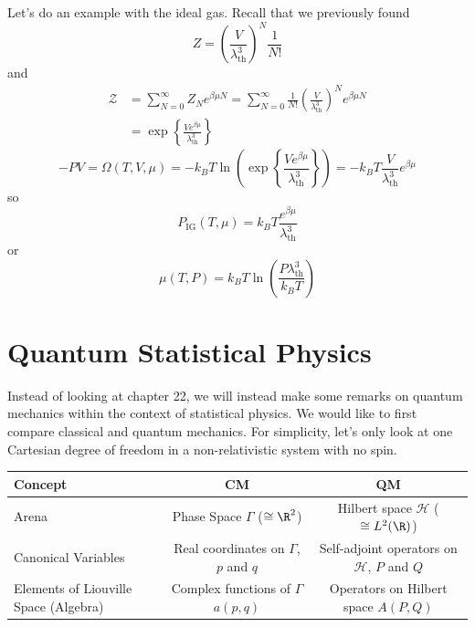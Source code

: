 \documentclass[a4paper,twoside,master.tex]{subfiles}
\begin{document}
\begin{ex}
    Let's do an example with the ideal gas. Recall that we previously found
    \begin{equation}
        Z = \left( \frac{V}{\lambda^3_{\text{th}}} \right)^N \frac{1}{N!}
    \end{equation}
    and
    \begin{align}
        \mathcal{Z} &= \sum_{N=0}^{\infty} Z_N e^{\beta \mu N} = \sum_{N=0}^{\infty} \frac{1}{N!} \left( \frac{V}{\lambda^3_{\text{th}}} \right)^N e^{\beta \mu N} \\
        &= \exp\left\{ \frac{V e^{\beta \mu}}{\lambda^3_{\text{th}}} \right\}
    \end{align}
    \begin{equation}
        - PV = \Omega(T,V, \mu) = - k_B T \ln(\exp\left\{ \frac{V e^{\beta \mu}}{\lambda^3_{\text{th}}} \right\}) = - k_B T \frac{V}{\lambda^3_{\text{th}}} e^{\beta \mu}
    \end{equation}
    so
    \begin{equation}
        P_{\text{IG}}(T, \mu) = k_B T \frac{e^{\beta \mu}}{\lambda^3_{\text{th}}}
    \end{equation}
    or
    \begin{equation}
        \mu(T,P) = k_B T \ln\left( \frac{P \lambda^3_{\text{th}}}{k_B T} \right)
    \end{equation}
\end{ex}

\section{Quantum Statistical Physics}
\label{sec:quantum_statistical_physics}

Instead of looking at chapter 22, we will instead make some remarks on quantum mechanics within the context of statistical physics. We would like to first compare classical and quantum mechanics. For simplicity, let's only look at one Cartesian degree of freedom in a non-relativistic system with no spin.

\begin{tabular}{@{}lcc@{}}
    Concept & CM & QM \\
    \toprule
    Arena & Phase Space $ \Gamma $ ($ \cong \R^2 $) & Hilbert space $ \mathcal{H} $ ($ \cong L^2(\R) $) \\
    \midrule
    Canonical Variables & Real coordinates on $ \Gamma $, $ p $ and $ q $ & Self-adjoint operators on $ \mathcal{H} $, $ P $ and $ Q $ \\
    \midrule
    Elements of Liouville Space (Algebra) & Complex functions of $ \Gamma $ $ a(p,q) $ & Operators on Hilbert space $ A(P,Q) $ \\
    \bottomrule
\end{tabular}
\end{document}
